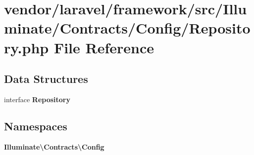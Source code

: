 \section{vendor/laravel/framework/src/\+Illuminate/\+Contracts/\+Config/\+Repository.php File Reference}
\label{_contracts_2_config_2_repository_8php}
\subsection*{Data Structures}
\begin{DoxyCompactItemize}
\item 
interface {\bf Repository}
\end{DoxyCompactItemize}
\subsection*{Namespaces}
\begin{DoxyCompactItemize}
\item 
 {\bf Illuminate\textbackslash{}\+Contracts\textbackslash{}\+Config}
\end{DoxyCompactItemize}
